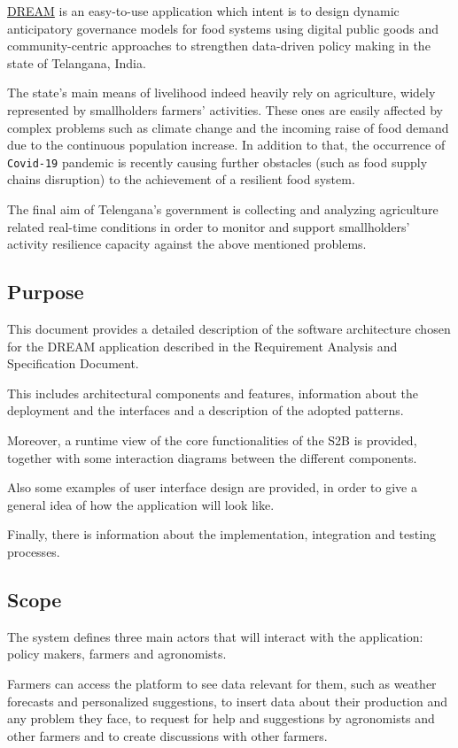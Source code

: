 \hyperref[tab:acronymsTable]{DREAM} is an easy-to-use application which intent is \cite{grw_GitHub} to design dynamic anticipatory governance models for food systems using digital public goods and community-centric approaches to strengthen data-driven policy making in the state of Telangana, India.

The state's main means of livelihood indeed heavily rely on agriculture, widely represented by smallholders farmers' activities. These ones are easily affected by complex problems such as climate change and the incoming raise of food demand due to the continuous population increase. In addition to that, the occurrence of \texttt{Covid-19} pandemic is recently causing further obstacles (such as food supply chains disruption) to the achievement of a resilient food system.

The final aim of Telengana's government is collecting and analyzing agriculture related real-time conditions in order to monitor and support smallholders' activity resilience capacity against the above mentioned problems.

\subsection{Purpose}
\label{sec:purpose}
This document provides a detailed description of the software architecture chosen for the DREAM application described in the Requirement Analysis and Specification Document. 

This includes architectural components and features, information about the deployment and the interfaces and a description of the adopted patterns. 

Moreover, a runtime view of the core functionalities of the S2B is provided, together with some interaction diagrams between the different components. 

Also some examples of user interface design are provided, in order to give a general idea of how the application will look like.

Finally, there is information about the implementation, integration and testing processes.


\subsection{Scope}
\label{sec:scope}
The system defines three main actors that will interact with the application: policy makers, farmers and agronomists.

Farmers can access the platform to see data relevant for them, such as weather forecasts and personalized suggestions, to insert data about their production and any problem they face, to request for help and suggestions by agronomists and other farmers and to create discussions with other farmers.


